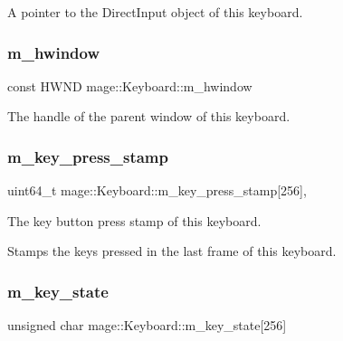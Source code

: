 A pointer to the Direct\+Input object of this keyboard. \hypertarget{classmage_1_1_keyboard_adad9c02695c121898ac578ca25dd5c9a}{}\label{classmage_1_1_keyboard_adad9c02695c121898ac578ca25dd5c9a} 
\subsubsection{\texorpdfstring{m\+\_\+hwindow}{m\_hwindow}}
{\footnotesize\ttfamily const H\+W\+ND mage\+::\+Keyboard\+::m\+\_\+hwindow\hspace{0.3cm}{\ttfamily [private]}}

The handle of the parent window of this keyboard. \hypertarget{classmage_1_1_keyboard_a8eb4ce7e4e2395bb27d2ac9236655335}{}\label{classmage_1_1_keyboard_a8eb4ce7e4e2395bb27d2ac9236655335} 
\subsubsection{\texorpdfstring{m\+\_\+key\+\_\+press\+\_\+stamp}{m\_key\_press\_stamp}}
{\footnotesize\ttfamily uint64\+\_\+t mage\+::\+Keyboard\+::m\+\_\+key\+\_\+press\+\_\+stamp\mbox{[}256\mbox{]}\hspace{0.3cm}{\ttfamily [mutable]}, {\ttfamily [private]}}

The key button press stamp of this keyboard.

Stamps the keys pressed in the last frame of this keyboard. \hypertarget{classmage_1_1_keyboard_a7499df459499f5addd50507ea1e2358c}{}\label{classmage_1_1_keyboard_a7499df459499f5addd50507ea1e2358c} 
\subsubsection{\texorpdfstring{m\+\_\+key\+\_\+state}{m\_key\_state}}
{\footnotesize\ttfamily unsigned char mage\+::\+Keyboard\+::m\+\_\+key\+\_\+state\mbox{[}256\mbox{]}\hspace{0.3cm}{\ttfamily [private]}}

